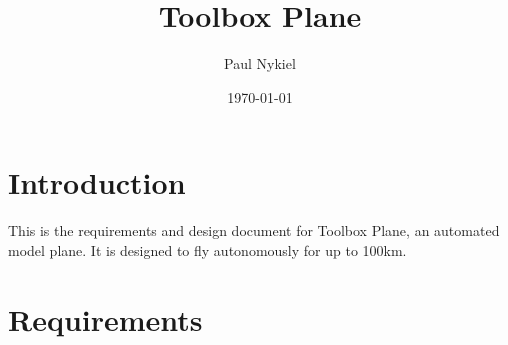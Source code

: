 \documentclass{scrartcl}
\title{Toolbox Plane}
\author{Paul Nykiel}
\date{\today}
\begin{document}
\maketitle
\tableofcontents
\section{Introduction}
This is the requirements and design document for
Toolbox Plane, an automated model plane. It is designed
to fly autonomously for up to 100km.

\section{Requirements}




\end{document}
